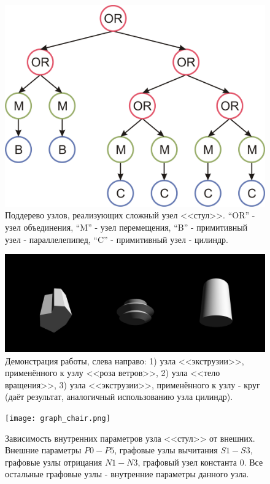 \documentclass[a4paper,hidelinks,12pt]{article}
\begin{document}
\begin{figure}[H]
\begin{center}
	\includegraphics[width=15 cm]{chiar.png}
	\caption{Поддерево узлов, реализующих сложный узел <<стул>>. ``OR'' - узел объединения, ``M'' - узел перемещения, ``B'' - примитивный узел - параллелепипед, ``C'' - примитивный узел - цилиндр.}
 	\label{fig_chair}
\end{center}
\end{figure}

\begin{figure}[H]
\begin{center}
	\includegraphics[width=15 cm]{extrusions_splines.png}
	\caption{Демонстрация работы, слева направо: 1) узла <<экструзии>>, применённого к узлу <<роза ветров>>, 2) узла <<тело вращения>>, 3) узла <<экструзии>>, применённого к узлу - круг (даёт результат, аналогичный использованию узла цилиндр).}
 	\label{fig_extr}
\end{center}
\end{figure}

\begin{figure}[H]
\begin{center}
	\texttt{[image: graph\_chair.png]}
	\caption{Зависимость внутренних параметров узла <<стул>> от внешних. Внешние параметры $P0-P5$, графовые узлы вычитания $S1-S3$, графовые узлы отрицания $N1-N3$, графовый узел константа $0$. Все остальные графовые узлы - внутренние параметры данного узла.}
 	\label{fig_graph_chair}
\end{center}
\end{figure}
\end{document}
